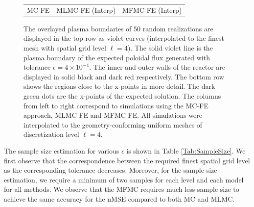 \begin{figure}[ht!]
\begin{tabular}{ccc}
\\[1ex]
\quad MC-FE &MLMC-FE (Interp) &MFMC-FE (Interp) \\[-0.5ex]
\end{tabular}
\caption{The overlayed plasma boundaries of 50 random realizations are 
displayed in the top row as violet curves (interpolated to the finest mesh with spatial grid level $\ell=4$). The solid violet line is the plasma boundary of the expected 
poloidal flux generated with tolerance $\epsilon=4\times 10^{-4}$. 
The inner and outer walls of the reactor are displayed in solid black and 
dark red respectively. The bottom row shows the regions close to the 
x-points in more detail. The dark green dots are the x-points of the expected 
solution. The columns from left to right correspond to simulations using the 
MC-FE approach, MLMC-FE and MFMC-FE. All simulations were interpolated to the geometry-conforming uniform meshes of discretization level $\ell=4$.} 
\label{fig:QoI_plot}
\end{figure}
%





The sample size estimation for various $\epsilon$ is shown in Table \ref{Tab:SampleSize}. We first observe that the correspondence between the required finest spatial grid level as the corresponding tolerance decreases. Moreover, for the sample size estimation, we require a minimum of two samples for each level and each model for all methods. We observe that the MFMC requires much less sample size to achieve the same accuracy for the nMSE compared to both MC and MLMC.


